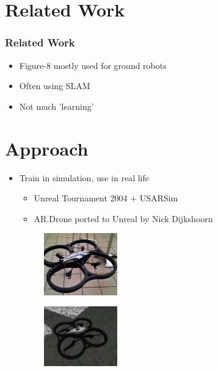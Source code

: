 \documentclass[10pt]{beamer}
\begin{document}
\section{Related Work}
\begin{frame}
 \frametitle{Related Work}
 \begin{itemize}
   \item Figure-8 mostly used for ground robots
   \item Often using SLAM
   \item Not much 'learning'
 \end{itemize}
\end{frame}

\section{Approach}
\begin{frame}
 \begin{itemize}
   \frametitle{Approach}
   \item Train in simulation, use in real life
   \begin{itemize}
     \item Unreal Tournament 2004 + USARSim
     \item AR.Drone ported to Unreal by Nick Dijkshoorn
   \end{itemize}
 \begin{figure}
  \includegraphics[width=0.3\textwidth]{img/ARDRONE}
 \end{figure}
 \begin{figure}
  \includegraphics[width=0.3\textwidth]{img/ardrone_sim}
 \end{figure}
 \end{itemize}
\end{frame}
\end{document}
